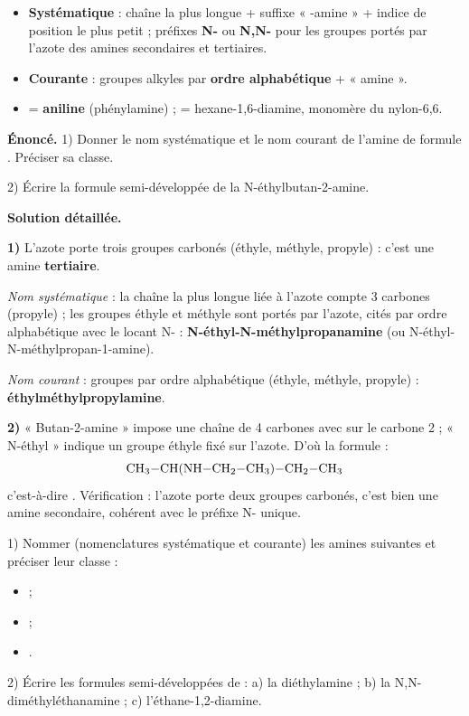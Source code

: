 \documentclass[11pt]{article}
\begin{document}
\begin{aretenir}
\begin{itemize}
\item \textbf{Systématique} : chaîne la plus longue + suffixe « -amine » + indice de position le plus petit ; préfixes \textbf{N-} ou \textbf{N,N-} pour les groupes portés par l'azote des amines secondaires et tertiaires.
\item \textbf{Courante} : groupes alkyles par \textbf{ordre alphabétique} + « amine ».
\item {} = \textbf{aniline} (phénylamine) ;  = hexane-1,6-diamine, monomère du nylon-6,6.
\end{itemize}
\end{aretenir}

\begin{exoresolu}
\textbf{Énoncé.} 1) Donner le nom systématique et le nom courant de l'amine de formule . Préciser sa classe.

2) Écrire la formule semi-développée de la N-éthylbutan-2-amine.

\tcblower
\textbf{Solution détaillée.}

\textbf{1)} L'azote porte trois groupes carbonés (éthyle, méthyle, propyle) : c'est une amine \textbf{tertiaire}.

\emph{Nom systématique} : la chaîne la plus longue liée à l'azote compte 3 carbones (propyle) ; les groupes éthyle et méthyle sont portés par l'azote, cités par ordre alphabétique avec le locant N- : \textbf{N-éthyl-N-méthylpropanamine} (ou N-éthyl-N-méthylpropan-1-amine).

\emph{Nom courant} : groupes par ordre alphabétique (éthyle, méthyle, propyle) : \textbf{éthylméthylpropylamine}.

\textbf{2)} « Butan-2-amine » impose une chaîne de 4 carbones avec  sur le carbone 2 ; « N-éthyl » indique un groupe éthyle fixé sur l'azote. D'où la formule :
\[ \ce{CH3-CH(NH-CH2-CH3)-CH2-CH3} \]
c'est-à-dire . Vérification : l'azote porte deux groupes carbonés, c'est bien une amine secondaire, cohérent avec le préfixe N- unique.
\end{exoresolu}

\begin{exercice}
1) Nommer (nomenclatures systématique et courante) les amines suivantes et préciser leur classe :
\begin{itemize}
\item {} ;
\item {} ;
\item {}.
\end{itemize}
2) Écrire les formules semi-développées de : a) la diéthylamine ; b) la N,N-diméthyléthanamine ; c) l'éthane-1,2-diamine.
\end{exercice}
\end{document}
